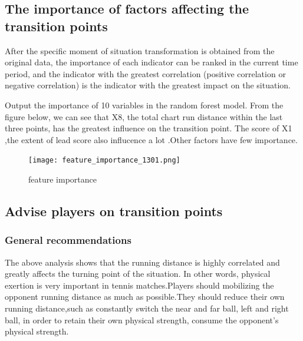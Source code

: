 \documentclass{mcmthesis}  %
\begin{document}
\newpage
\subsection{The importance of factors affecting the transition points}
\hspace{1.5em}After the specific moment of situation transformation is obtained from the original data, the importance of each indicator  can be ranked in the current time period, and the indicator with the greatest correlation (positive correlation or negative correlation) is the indicator with the greatest impact on the situation.
\par Output the importance of 10 variables in the random forest model. From the figure below, we can see that X8, the total chart run distance within the last three points, has the greatest influence on the transition point. The score of X1 ,the extent of lead score also influcence a lot .Other factors have few importance.
\newpage

\begin{figure}[h]  %
\small
\centering  %
\texttt{[image: feature\_importance\_1301.png]}  %
\caption{feature importance} \label{fig:feature_importance_1301.png}  %
\end{figure}  %



\subsection{Advise players on transition points}
\subsubsection{General recommendations}
\hspace{1.5em}The above analysis shows that the running distance is highly correlated and greatly affects the turning point of the situation. In other words, physical exertion is very important in tennis matches.Players should mobilizing the opponent running distance as much as possible.They should reduce their own running distance,such as constantly switch the near and far ball, left and right ball, in order to retain their own physical strength, consume the opponent's physical strength. 
\end{document}
